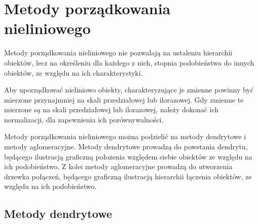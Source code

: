 \documentclass[12pt,a4paper]{report}
\begin{document}


\newpage
\section{Metody porządkowania nieliniowego}
\noindent

Metody porządkowania nieliniowego nie pozwalają na ustaleniu hierarchii obiektów, lecz na określeniu dla każdego z nich, stopnia podobieństwa do innych obiektów, ze względu na ich charakterystyki. 

Aby uporządkować nieliniowo obiekty, charakteryzujące je zmienne powinny być mierzone przynajmniej na skali przedziałowej lub ilorazowej. Gdy zmienne te mierzone są na skali przedziałowej lub ilorazowej, należy dokonać ich normalizacji, dla zapewnienia ich porównywalności.

Metody porządkowania nieliniowego można podzielić na metody dendrytowe i metody aglomeracyjne. Metody dendrytowe prowadzą do powstania dendrytu, będącego ilustracją graficzną  położenia względem siebie obiektów ze względu na ich podobieństwo. Z kolei metody aglomeracyjne prowadzą do utworzenia drzewka połączeń, będącego graficzną ilustracją hierarchii łączenia obiektów, ze względu na ich podobieństwo.

\subsection{Metody dendrytowe}
\noindent 
\end{document}
